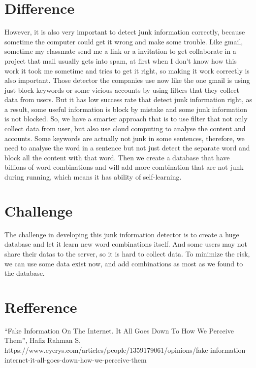 \documentclass[12pt]{article}
\begin{document}
\section{Difference}
However, it is also very important to detect junk information correctly, because sometime the computer could get it wrong and make some trouble. Like gmail, sometime my classmate send me a link or a invitation to get collaborate in a project that mail usually gets into spam, at first when I don’t know how this work it took me sometime and tries to get it right, so making it work correctly is also important.
Those detector the companies use now like the one gmail is using just block keywords or some vicious accounts by using filters that they collect data from users. But it has low success rate that detect junk information right, as a result, some useful information is block by mistake and some junk information is not blocked. So, we have a smarter approach that is to use filter that not only collect data from user, but also use cloud computing to analyse the content and accounts. Some keywords are actually not  junk in some sentences, therefore, we need to analyse the word in a sentence but not just detect the separate word and block all the content with that word. Then we create a database that have billions of word combinations and will add more combination that are not junk during running, which means it has ability of self-learning.
\section{Challenge}
The challenge in developing this junk information detector is to create a huge database and let it learn new word combinations itself. And some users may not share their datas to the server, so it is hard to collect data. To minimize the risk, we can use some data exist now, and add combinations as most as we found to the database.

\section{Refference}

“Fake Information On The Internet. It All Goes Down To How We Perceive Them”, Hafiz Rahman S, https://www.eyerys.com/articles/people/1359179061/opinions/fake-information-internet-it-all-goes-down-how-we-perceive-them

\end{document}
